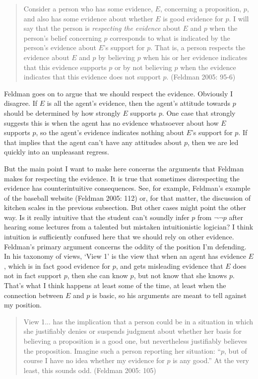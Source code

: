\begin{quote}
Consider a person who has some evidence, \(E\), concerning a proposition, \(p\), and also has some evidence about whether \(E\) is good evidence for \(p\). I will say that the person is \textit{respecting the evidence} about \(E\) and \(p\) when the person's belief concerning \(p\) corresponds to what is indicated by the person's evidence about \(E\)'s support for \(p\). That is, a person respects the evidence about \(E\) and \(p\) by believing \(p\) when his or her evidence indicates that this evidence supports \(p\) or by not believing \(p\) when the evidence indicates that this evidence does not support \(p\). (Feldman 2005: 95-6)
\end{quote}

\noindent Feldman goes on to argue that we should respect the evidence. Obviously I disagree. If \(E\) is all the agent's evidence, then the agent's attitude towards \(p\) should be determined by how strongly \(E\) supports \(p\). One case that strongly suggests this is when the agent has no evidence whatsoever about how \(E\) supports \(p\), so the agent's evidence indicates nothing about \(E\)'s support for \(p\). If that implies that the agent can't have any attitudes about \(p\), then we are led quickly into an unpleasant regress.

But the main point I want to make here concerns the arguments that Feldman makes for respecting the evidence. It is true that sometimes disrespecting the evidence has counterintuitive consequences. See, for example, Feldman's example of the baseball website (Feldman 2005: 112) or, for that matter, the discussion of kitchen scales in the previous subsection. But other cases might point the other way. Is it really intuitive that the student can't soundly infer \(p\) from \(\neg \neg p\) after hearing some lectures from a talented but mistaken intuitionistic logician? I think intuition is sufficiently confused here that we should rely on other evidence. Feldman's primary argument concerns the oddity of the position I'm defending. In his taxonomy of views, `View 1' is the view that when an agent has evidence \(E\), which is in fact good evidence for \(p\), and gets misleading evidence that \(E\) does not in fact support \(p\), then she can know \(p\), but not know that she knows \(p\). That's what I think happens at least some of the time, at least when the connection between \(E\) and \(p\) is basic, so his arguments are meant to tell against my position.

\begin{quote}
View 1... has the implication that a person could be in a situation in which she justifiably denies or suspends judgment about whether her basis for believing a proposition is a good one, but nevertheless justifiably believes the proposition. Imagine such a person reporting her situation: ``\(p\), but of course I have no idea whether my evidence for \(p\) is any good.'' At the very least, this sounds odd. (Feldman 2005: 105)
\end{quote}

